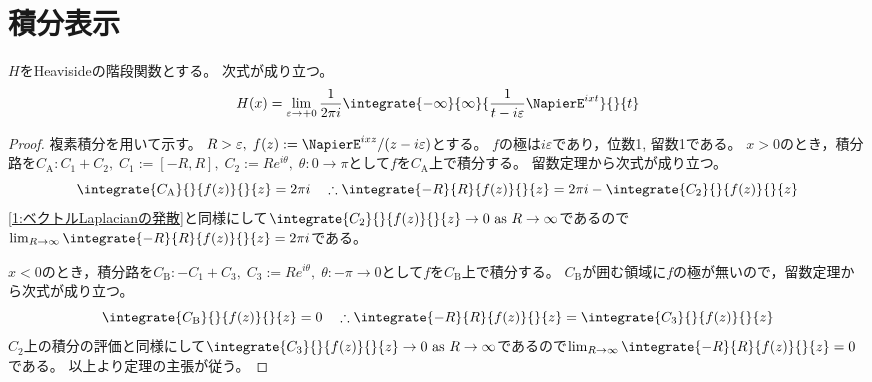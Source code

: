         \section{積分表示}
            \begin{shadebox}
                $H$をHeavisideの階段関数とする。
                次式が成り立つ。
                \[ H(x) = \lim_{\varepsilon\to +0}\frac{1}{2\pi i}\integrate{-\infty}{\infty}{\frac{1}{t-i\varepsilon}\NapierE^{ixt}}{}{t} \]
            \end{shadebox}
            \begin{proof}
                \quad\par
                複素積分を用いて示す。
                $R>\varepsilon,\;f(z) := \NapierE^{ixz}/(z-i\varepsilon)$とする。
                $f$の極は$i\varepsilon$であり，位数1, 留数1である。
                $x>0$のとき，積分路を$C_\mathrm{A}: C_1 + C_2,\; C_1 := [-R,R],\; C_2 := Re^{i\theta},\;\theta:0\to\pi$として$f$を$C_\mathrm{A}$上で積分する。
                留数定理から次式が成り立つ。
                \[ \integrate{C_\mathrm{A}}{}{f(z)}{}{z} = 2\pi i \quad \therefore \integrate{-R}{R}{f(z)}{}{z} = 2\pi i - \integrate{C_2}{}{f(z)}{}{z} \]
                \cite{数学備忘録}\ref{1:ベクトルLaplacianの発散}と同様にして$\integrate{C_2}{}{f(z)}{}{z} \to 0 \text{ as }R\to\infty$であるので$\lim_{R\to\infty}\integrate{-R}{R}{f(z)}{}{z} = 2\pi i$である。
                \par
                $x<0$のとき，積分路を$C_\mathrm{B}: -C_1 + C_3,\; C_3 := Re^{i\theta},\;\theta:-\pi\to 0$として$f$を$C_\mathrm{B}$上で積分する。
                $C_\mathrm{B}$が囲む領域に$f$の極が無いので，留数定理から次式が成り立つ。
                \[ \integrate{C_\mathrm{B}}{}{f(z)}{}{z} = 0 \quad \therefore \integrate{-R}{R}{f(z)}{}{z} = \integrate{C_3}{}{f(z)}{}{z} \]
                $C_\mathrm{2}$上の積分の評価と同様にして$\integrate{C_3}{}{f(z)}{}{z} \to 0 \text{ as }R\to\infty$であるので$\lim_{R\to\infty}\integrate{-R}{R}{f(z)}{}{z} = 0$である。
                以上より定理の主張が従う。
            \end{proof}
